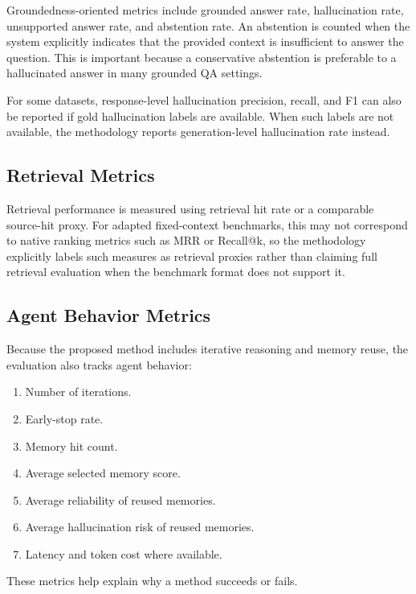 Groundedness-oriented metrics include grounded answer rate, hallucination rate, unsupported answer rate, and abstention rate. An abstention is counted when the system explicitly indicates that the provided context is insufficient to answer the question. This is important because a conservative abstention is preferable to a hallucinated answer in many grounded QA settings.

For some datasets, response-level hallucination precision, recall, and F1 can also be reported if gold hallucination labels are available. When such labels are not available, the methodology reports generation-level hallucination rate instead.

\subsection{Retrieval Metrics}
\label{subsec:methodology-retrieval-metrics}

Retrieval performance is measured using retrieval hit rate or a comparable source-hit proxy. For adapted fixed-context benchmarks, this may not correspond to native ranking metrics such as MRR or Recall@k, so the methodology explicitly labels such measures as retrieval proxies rather than claiming full retrieval evaluation when the benchmark format does not support it.

\subsection{Agent Behavior Metrics}
\label{subsec:methodology-agent-metrics}

Because the proposed method includes iterative reasoning and memory reuse, the evaluation also tracks agent behavior:

\begin{enumerate}[leftmargin=*]
\item Number of iterations.
\item Early-stop rate.
\item Memory hit count.
\item Average selected memory score.
\item Average reliability of reused memories.
\item Average hallucination risk of reused memories.
\item Latency and token cost where available.
\end{enumerate}

These metrics help explain why a method succeeds or fails.

